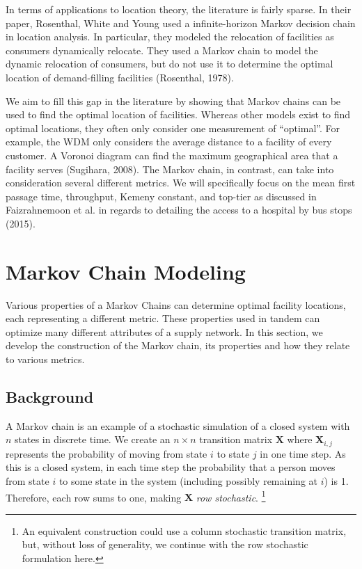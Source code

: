 \documentclass[twoside,twocolumn]{article}
\begin{document}
In terms of applications to location theory, the literature is fairly sparse.
In their paper, Rosenthal, White and Young used a infinite-horizon Markov decision chain in location analysis.
In particular, they modeled the relocation of facilities as consumers dynamically relocate.
They used a Markov chain to model the dynamic relocation of consumers, but do not use it to determine the optimal location of demand-filling facilities (Rosenthal, 1978).

We aim to fill this gap in the literature by showing that Markov chains can be used to find the optimal location of facilities.
Whereas other models exist to find optimal locations, they often only consider one measurement of ``optimal''.
For example, the WDM only considers the average distance to a facility of every customer.
A Voronoi diagram can find the maximum geographical area that a facility serves (Sugihara, 2008).
The Markov chain, in contrast, can take into consideration several different metrics.
We will specifically focus on the mean first passage time, throughput, Kemeny constant, and top-tier as discussed in Faizrahnemoon et al. in regards to detailing the access to a hospital by bus stops (2015).

\section{Markov Chain Modeling}

Various properties of a Markov Chains can determine optimal facility locations, each representing a different metric.
These properties used in tandem can optimize many different attributes of a supply network.
In this section, we develop the construction of the Markov chain, its properties and how they relate to various metrics.

\subsection{Background}

A Markov chain is an example of a stochastic simulation of a closed system with $n$ states in discrete time.
We create an $n\times n$ transition matrix $\textbf{X}$ where $\textbf{X}_{i, j}$ represents the probability of moving from state $i$ to state $j$ in one time step.
As this is a closed system, in each time step the probability that a person moves from state $i$ to some state in the system (including possibly remaining at $i$) is 1. 
Therefore, each row sums to one, making $\textbf{X}$ {\em row stochastic}.
\footnote{An equivalent construction could use a column stochastic transition matrix, but, without loss of generality, we continue with the row stochastic formulation here.}
\end{document}
